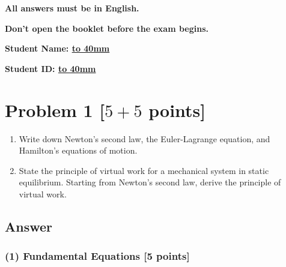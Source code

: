 \documentclass[11pt, a4paper]{article} %
\begin{document}
{\Large \bf \color{orange} \hspace{2em} All answers must be in English.}
\vspace*{2mm}

{\Large \bf \color{orange} \hspace{2em} Don't open the booklet before the exam begins.}
\vspace{5cm}

\begin{center}
{\Large \bf Student Name: \underline{\hbox to 40mm{}}}
\vspace*{8mm}

{\Large \bf Student ID: \underline{\hbox to 40mm{}}}
\vspace*{2mm}
\end{center}

\newpage
\section*{Problem 1 [$5 + 5$ points]} 
\begin{enumerate}
  \item[(1)] Write down Newton’s second law, the Euler-Lagrange equation, and Hamilton’s equations of motion. 

  \item[(2)] State the principle of virtual work for a mechanical system in static equilibrium. Starting from Newton’s second law, derive the principle of virtual work.

  \end{enumerate}

\subsection*{Answer}
\subsubsection*{(1) Fundamental Equations [5 points]}
\end{document}
